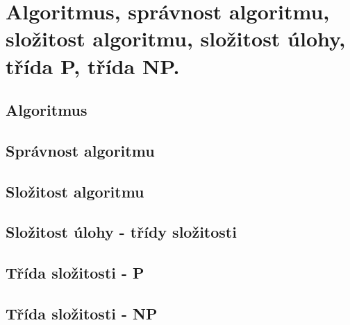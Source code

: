 \section[TAL - Algoritmus, P, NP]{Algoritmus, správnost algoritmu, složitost algoritmu, složitost úlohy, třída P, třída NP.}

\subsection*{Algoritmus}

\subsection*{Správnost algoritmu}

\subsection*{Složitost algoritmu}

\subsection*{Složitost úlohy - třídy složitosti}

\subsection*{Třída složitosti - P}
\label{heading:05-npc}

\subsection*{Třída složitosti - NP}
